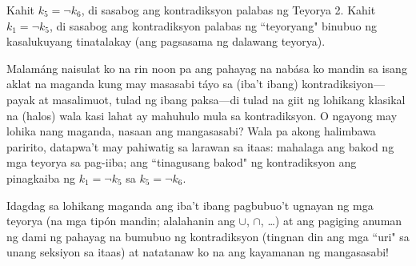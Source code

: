 \documentclass{article}
\begin{document}
\begin{center}
\end{center}

Kahit $k_5 = \neg k_6$, di sasabog ang kontradiksyon palabas ng Teyorya 2. Kahit $k_1 = \neg k_5$, di sasabog ang kontradiksyon palabas ng ``teyoryang" binubuo ng kasalukuyang tinatalakay (ang pagsasama ng dalawang teyorya).

Malamáng naisulat ko na rin noon pa ang pahayag na nabása ko mandin sa isang aklat na maganda kung may masasabi táyo sa (iba't ibang) kontradiksiyon---payak at masalimuot, tulad ng ibang paksa---di tulad na giit ng lohikang klasikal na (halos) wala kasi lahat ay mahuhulo mula sa kontradiksyon. O ngayong may lohika nang maganda, nasaan ang mangasasabi? Wala pa akong halimbawa paririto, datapwa't may pahiwatig sa larawan sa itaas: mahalaga ang bakod ng mga teyorya sa pag-iiba; ang ``tinagusang bakod" ng kontradiksyon ang pinagkaiba ng $k_1 = \neg k_5$ sa $k_5 = \neg k_6$.

\begin{center}
\end{center}

Idagdag sa lohikang maganda ang iba't ibang pagbubuo't ugnayan ng mga teyorya (na mga tipón mandin; alalahanin ang $\cup$, $\cap$, \ldots) at ang pagiging anuman ng dami ng pahayag na bumubuo ng kontradiksyon (tingnan din ang mga ``uri" sa unang seksiyon sa itaas) at natatanaw ko na ang kayamanan ng mangasasabi!
\end{document}
